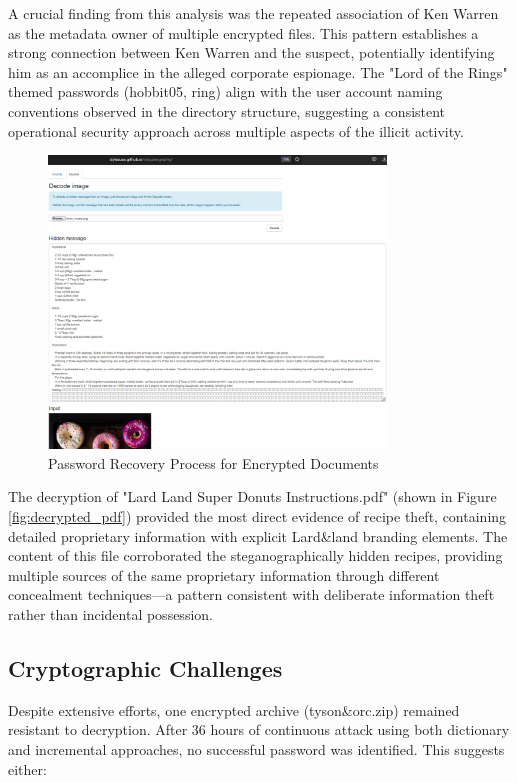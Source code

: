 A crucial finding from this analysis was the repeated association of Ken Warren as the metadata owner of multiple encrypted files. This pattern establishes a strong connection between Ken Warren and the suspect, potentially identifying him as an accomplice in the alleged corporate espionage. The "Lord of the Rings" themed passwords (hobbit05, ring) align with the user account naming conventions observed in the directory structure, suggesting a consistent operational security approach across multiple aspects of the illicit activity.

\begin{figure}[h]
    \centering
    \includegraphics[width=0.8\textwidth]{images/Artifact and Evidence Recovery/bean_extract.png}
    \caption{Password Recovery Process for Encrypted Documents}
    \label{fig:password_cracking}
\end{figure}

The decryption of "Lard Land Super Donuts Instructions.pdf" (shown in Figure \ref{fig:decrypted_pdf}) provided the most direct evidence of recipe theft, containing detailed proprietary information with explicit Lard\&land branding elements. The content of this file corroborated the steganographically hidden recipes, providing multiple sources of the same proprietary information through different concealment techniques—a pattern consistent with deliberate information theft rather than incidental possession.

\subsection{Cryptographic Challenges}
Despite extensive efforts, one encrypted archive (tyson\&orc.zip) remained resistant to decryption. After 36 hours of continuous attack using both dictionary and incremental approaches, no successful password was identified. This suggests either:

